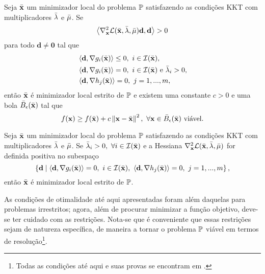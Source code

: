 \begin{theorem}
Seja $\bar{\mathbf{x}}$ um minimizador local do problema $\mathbb{P}$ satisfazendo as condi\c{c}\~{o}es KKT com multiplicadores $\bar{\mathbf{\lambda}}$ e $\bar{\mathbf{\mu}}$. Se 
\begin{equation}
\left\langle\nabla_{\mathbf{x}}^{2} \mathcal{L}(\bar{\mathbf{x}},\bar{\mathbf{\lambda}},\bar{\mathbf{\mu}})\mathbf{d},\mathbf{d}\right\rangle > 0
\end{equation}
para todo $\mathbf{d} \ne \mathbf{0}$ tal que
\begin{equation}
\begin{aligned}
&\left\langle\mathbf{d},\nabla g_i(\bar{\mathbf{x}})\right\rangle \le 0,~i \in \mathcal{I}(\bar{\mathbf{x}}), \\
&\left\langle\mathbf{d},\nabla g_i(\bar{\mathbf{x}})\right\rangle = 0,~i \in \mathcal{I}(\bar{\mathbf{x}}) \text{ e } \bar{\mathbf{\lambda}}_{i} > 0, \\
&\left\langle\mathbf{d},\nabla h_j(\bar{\mathbf{x}})\right\rangle = 0,~j = 1,...,m,
\end{aligned}
\end{equation}
ent\~{a}o $\bar{\mathbf{x}}$ \'{e} minimizador local estrito de $\mathbb{P}$ e existem uma constante $c > 0$ e uma bola $\bar{B}_{\epsilon}(\bar{\mathbf{x}})$ tal que
\begin{equation}
f(\mathbf{x}) \ge f(\bar{\mathbf{x}}) + c\left\lVert\mathbf{x} - \bar{\mathbf{x}}\right\rVert^{2},~\forall \mathbf{x} \in \bar{B}_{\epsilon}(\bar{\mathbf{x}}) \text{ vi\'{a}vel.}
\end{equation}
\end{theorem}

\begin{corollary}
Seja $\bar{\mathbf{x}}$ um minimizador local do problema $\mathbb{P}$ satisfazendo as condi\c{c}\~{o}es KKT com multiplicadores $\bar{\mathbf{\lambda}}$ e $\bar{\mathbf{\mu}}$. Se $\bar{\mathbf{\lambda}}_i > 0,~\forall i \in \mathcal{I}(\bar{\mathbf{x}})$ e a Hessiana $\nabla_{\mathbf{x}}^{2} \mathcal{L}(\bar{\mathbf{x}},\bar{\mathbf{\lambda}},\bar{\mathbf{\mu}})$ for definida positiva no subespa\c{c}o
\begin{equation*}
\left\lbrace\mathbf{d} \mid \left\langle\mathbf{d},\nabla g_i(\bar{\mathbf{x}})\right\rangle = 0,~i \in \mathcal{I}(\bar{\mathbf{x}}),~\left\langle\mathbf{d},\nabla h_j(\bar{\mathbf{x}})\right\rangle = 0,~j = 1,...,m\right\rbrace,
\end{equation*}
ent\~{a}o $\bar{\mathbf{x}}$ \'{e} minimizador local estrito de $\mathbb{P}$.
\end{corollary}

As condi\c{c}\~{o}es de otimalidade at\'{e} aqui apresentadas foram al\'{e}m daquelas para problemas irrestritos; agora, al\'{e}m de procurar minimizar a fun\c{c}\~{a}o objetivo, deve-se ter cuidado com as restri\c{c}\~{o}es. Nota-se que \'{e} conveniente que essas restri\c{c}\~{o}es sejam de natureza espec\'{i}fica, de maneira a tornar o problema $\mathbb{P}$ vi\'{a}vel em termos de resolu\c{c}\~{a}o\footnote{Todas as condi\c{c}\~{o}es at\'{e} aqui e suas provas se encontram em \cite[pp. 230-235]{guller}.}.


